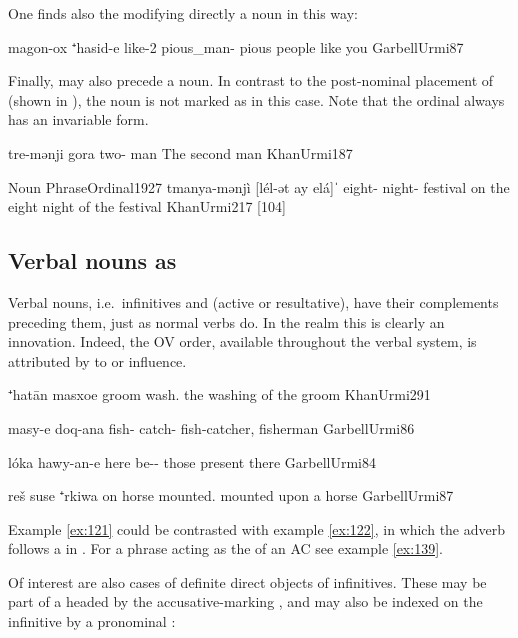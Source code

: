 One finds also the   modifying directly a noun in this way:

{magon-ox ⁺hasid-e}
{like-2\masc{} pious\_man-\pl}
{pious people like you}
{GarbellUrmi}{87} 

Finally,  may also precede a \prim noun. In contrast to the post-nominal placement of  (shown in ), the \prim noun is not marked as \cst* in this case. Note that the ordinal always has an invariable form.

{tre-mənji gora}
{two-\ord{} man}
{The second man}
{KhanUrmi}{187}

\acex
{Noun Phrase}{Ordinal}{1927}
{tmanya-mənjì [lél-ət ay elá]ˈ}
{eight-\ord{} night-\cst{} \lnk{} festival}
{on the eight night of the festival}
{KhanUrmi}{217 {[104]}}

\subsection{Verbal nouns as \prims} \label{ss:JUrm_inverse_Verbal}

Verbal nouns, i.e.\ infinitives and  (active or resultative), have their complements preceding them, just as normal verbs do. In the  realm this is clearly an innovation. Indeed, the \JUrm OV order, available throughout the verbal system, is attributed by \citet[172, \S 2.32.22.1]{Garbell1965impact} to \Kur or \Azr influence.


{⁺hatān masxoe}
{groom wash.\inf}
{the washing of the groom}
{KhanUrmi}{291}

{masy-e doq-ana}
{fish-\pl{} catch-\ptcp}
{fish-catcher, fisherman}
{GarbellUrmi}{86}

{lóka hawy-an-e}
{here be-\ptcp-\pl}
{those present there}
{GarbellUrmi}{84}

{reš suse ⁺rkiwa}
{on horse mounted.\resl}
{mounted upon a horse}
{GarbellUrmi}{87}\antipar 
\newpage 

Example \vref{ex:121} could be contrasted with example \vref{ex:122}, in which the adverb {follows} a  in \cst*. For a  phrase acting as the \prim of an AC see example \vref{ex:139}.

Of interest are also cases of definite direct objects of infinitives. These may be part of a  headed by the accusative-marking , and may also be indexed on the infinitive by a pronominal : 


